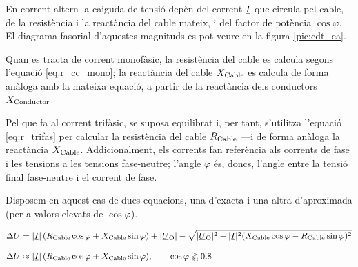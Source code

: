 En corrent altern la caiguda de tensió
depèn del  corrent $\cmplx{I}$ que circula pel cable, de la
resistència i la reactància del  cable mateix, i del factor de
potència $\cos \varphi$. El diagrama fasorial d'aquestes magnituds
es pot veure en la figura \vref{pic:cdt_ca}.

\begin{center}
   
   \label{pic:cdt_ca}
\end{center}

Quan es tracta de corrent monofàsic, la resistència del cable es calcula segons l'equació
\eqref{eq:r_cc_mono}; la reactància del cable $X_\mathrm{Cable}$ es calcula de forma anàloga
amb la mateixa equació, a partir de la reactància dels conductors $X_\mathrm{Conductor}$.

Pel que fa al corrent trifàsic, se suposa equilibrat i, per tant, s'utilitza l'equació
\eqref{eq:r_trifas} per calcular la resistència del cable $R_\mathrm{Cable}$ ---i de forma
anàloga la reactància $X_\mathrm{Cable}$. Addicionalment, els corrents fan referència als
corrents de fase i les tensions a les tensions fase-neutre; l'angle $\varphi$ és, doncs,
 l'angle entre la tensió final fase-neutre i el corrent de fase.

Disposem en aquest cas de dues equacions, una d'exacta i una altra d'aproximada (per a valors elevats de $\cos \varphi$).

\begin{subequations}
\begin{align}
   \Delta U &= |\cmplx{I}| \,( R\ped{Cable} \cos \varphi + X\ped{Cable} \sin \varphi) + |\cmplx{U}\ped{O}| - \sqrt{|\cmplx{U}\ped{O}|^2 - |\cmplx{I}|^2 ( X\ped{Cable} \cos \varphi - R\ped{Cable} \sin \varphi )^2} \label{eq:cdt_trif_exact} \\[2ex]
   \Delta U &\approx |\cmplx{I}| \,( R\ped{Cable} \cos \varphi + X\ped{Cable} \sin \varphi), \qquad \cos \varphi \gtrapprox \num{0,8} \label{eq:cdt_trif_aprox}
\end{align}
\end{subequations}


